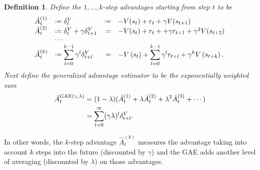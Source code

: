 \documentclass[20pt]{extarticle}
\theoremstyle{plain}
\newtheorem{definition}[theorem]{Definition}
\theoremstyle{definition}
\theoremstyle{remark}
\newcommand{\0}{\varnothing}
\renewcommand{\d}{\delta}
\newcommand{\g}{\gamma}
\renewcommand{\l}{\lambda}
\newcommand*{\defeq}{\mathrel{\vcenter{\baselineskip0.5ex \lineskiplimit0pt
           \hbox{\scriptsize.}\hbox{\scriptsize.}}}
           =}
\newcommand{\<}{\langle}
\renewcommand{\>}{\rangle}
\begin{document}
\begin{definition}
Define the $ 1, \ldots, k $-step advantages starting from step $ t $ to be
\small
\[
\begin{array}{llrl}
\hat{A}^{(1)}_{t} &\defeq \d^{V}_{t} &\defeq & -V(s_t) + r_t + \g V(s_{t+1}) \\
\hat{A}^{(2)}_{t} &\defeq \d^{V}_{t} + \g \d^{V}_{t+1} &= & -V(s_t) + r_t + + \g r_{t+1} + \g^2 V(s_{t+2}) \\
& \cdots \\
\hat{A}^{(k)}_{t} &\defeq \displaystyle\sum _ { l = 0 } ^ { k - 1 } \gamma ^ { l } \delta _ { t + l } ^ { V } &= & - V \left( s _ { t } \right) + \displaystyle\sum^{k-1}_{l=0 }\gamma ^ { l } r _ { t + l } + \gamma ^ { k } V \left( s _ { t + k } \right).
\end{array}
\]
\normalsize
Next define the generalized advantage estimator to be the exponentially weighted sum
\begin{align*}
\hat{A}^{\rm{GAE}(\g, \l)}_{t} &= (1 - \l) (\hat{A}^{(1)}_{t} + \l \hat{A}^{(2)}_{t} + \l^2 \hat{A}^{(3)}_{t} + \cdots) \\
&= \sum^{\infty}_{l=0} (\g\l)^l \d^V_{t+l}.
\end{align*}
\end{definition}

In other words, the $ k $-step advantage $ \hat{A}^{(k)}_{t} $ measures the advantage taking into account $ k $ steps into the future (discounted by $ \g $) and the GAE adds another level of averaging (discounted by $ \l $) on those advantages.
\end{document}
